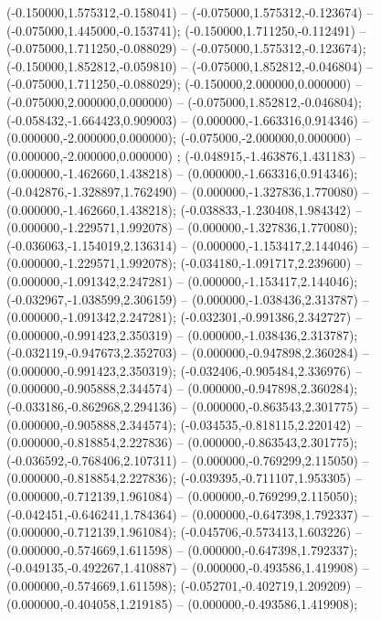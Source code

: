  (-0.150000,1.575312,-0.158041) -- (-0.075000,1.575312,-0.123674) -- (-0.075000,1.445000,-0.153741);
 (-0.150000,1.711250,-0.112491) -- (-0.075000,1.711250,-0.088029) -- (-0.075000,1.575312,-0.123674);
 (-0.150000,1.852812,-0.059810) -- (-0.075000,1.852812,-0.046804) -- (-0.075000,1.711250,-0.088029);
 (-0.150000,2.000000,0.000000) -- (-0.075000,2.000000,0.000000) -- (-0.075000,1.852812,-0.046804);
 (-0.058432,-1.664423,0.909003) -- (0.000000,-1.663316,0.914346) -- (0.000000,-2.000000,0.000000);
 (-0.075000,-2.000000,0.000000) -- (0.000000,-2.000000,0.000000) ;
 (-0.048915,-1.463876,1.431183) -- (0.000000,-1.462660,1.438218) -- (0.000000,-1.663316,0.914346);
 (-0.042876,-1.328897,1.762490) -- (0.000000,-1.327836,1.770080) -- (0.000000,-1.462660,1.438218);
 (-0.038833,-1.230408,1.984342) -- (0.000000,-1.229571,1.992078) -- (0.000000,-1.327836,1.770080);
 (-0.036063,-1.154019,2.136314) -- (0.000000,-1.153417,2.144046) -- (0.000000,-1.229571,1.992078);
 (-0.034180,-1.091717,2.239600) -- (0.000000,-1.091342,2.247281) -- (0.000000,-1.153417,2.144046);
 (-0.032967,-1.038599,2.306159) -- (0.000000,-1.038436,2.313787) -- (0.000000,-1.091342,2.247281);
 (-0.032301,-0.991386,2.342727) -- (0.000000,-0.991423,2.350319) -- (0.000000,-1.038436,2.313787);
 (-0.032119,-0.947673,2.352703) -- (0.000000,-0.947898,2.360284) -- (0.000000,-0.991423,2.350319);
 (-0.032406,-0.905484,2.336976) -- (0.000000,-0.905888,2.344574) -- (0.000000,-0.947898,2.360284);
 (-0.033186,-0.862968,2.294136) -- (0.000000,-0.863543,2.301775) -- (0.000000,-0.905888,2.344574);
 (-0.034535,-0.818115,2.220142) -- (0.000000,-0.818854,2.227836) -- (0.000000,-0.863543,2.301775);
 (-0.036592,-0.768406,2.107311) -- (0.000000,-0.769299,2.115050) -- (0.000000,-0.818854,2.227836);
 (-0.039395,-0.711107,1.953305) -- (0.000000,-0.712139,1.961084) -- (0.000000,-0.769299,2.115050);
 (-0.042451,-0.646241,1.784364) -- (0.000000,-0.647398,1.792337) -- (0.000000,-0.712139,1.961084);
 (-0.045706,-0.573413,1.603226) -- (0.000000,-0.574669,1.611598) -- (0.000000,-0.647398,1.792337);
 (-0.049135,-0.492267,1.410887) -- (0.000000,-0.493586,1.419908) -- (0.000000,-0.574669,1.611598);
 (-0.052701,-0.402719,1.209209) -- (0.000000,-0.404058,1.219185) -- (0.000000,-0.493586,1.419908);
